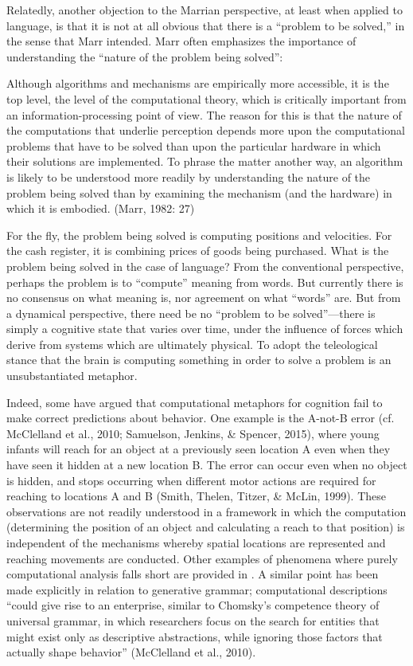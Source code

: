   Relatedly, another objection to the Marrian perspective, at least when applied to language, is that it is not at all obvious that there is a “problem to be solved,” in the sense that Marr intended. Marr often emphasizes the importance of understanding the “nature of the problem being solved”:

Although algorithms and mechanisms are empirically more accessible, it is the top level, the level of the computational theory, which is critically important from an information-processing point of view. The reason for this is that the nature of the computations that underlie perception depends more upon the computational problems that have to be solved than upon the particular hardware in which their solutions are implemented. To phrase the matter another way, an algorithm is likely to be understood more readily by understanding the nature of the problem being solved than by examining the mechanism (and the hardware) in which it is embodied. (Marr, 1982: 27)

  For the fly, the problem being solved is computing positions and velocities. For the cash register, it is combining prices of goods being purchased. What is the problem being solved in the case of language? From the conventional perspective, perhaps the problem is to “compute” meaning from words. But currently there is no consensus on what meaning is, nor agreement on what “words” are. But from a dynamical perspective, there need be no “problem to be solved”—there is simply a cognitive state that varies over time, under the influence of forces which derive from systems which are ultimately physical. To adopt the teleological stance that the brain is computing something in order to solve a problem is an unsubstantiated metaphor.

  Indeed, some have argued that computational metaphors for cognition fail to make correct predictions about behavior. One example is the A-not-B error (cf. McClelland et al., 2010; Samuelson, Jenkins, \& Spencer, 2015), where young infants will reach for an object at a previously seen location A even when they have seen it hidden at a new location B. The error can occur even when no object is hidden, and stops occurring when different motor actions are required for reaching to locations A and B (Smith, Thelen, Titzer, \& McLin, 1999). These observations are not readily understood in a framework in which the computation (determining the position of an object and calculating a reach to that position) is independent of the mechanisms whereby spatial locations are represented and reaching movements are conducted. Other examples of phenomena where purely computational analysis falls short are provided in \citet{SamuelsonEtAl2015}. A similar point has been made explicitly in relation to generative grammar; computational descriptions “could give rise to an enterprise, similar to Chomsky’s competence theory of universal grammar, in which researchers focus on the search for entities that might exist only as descriptive abstractions, while ignoring those factors that actually shape behavior” (McClelland et al., 2010).

